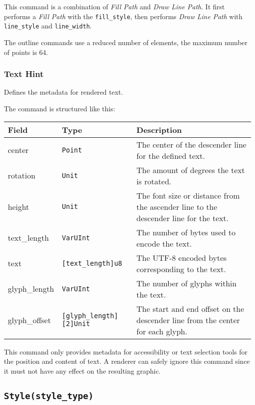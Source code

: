 \documentclass[]{article}
\begin{document}
This command is a combination of \emph{Fill Path} and \emph{Draw Line Path}.
It first performs a \emph{Fill Path} with the \texttt{fill\_style}, then
performs \emph{Draw Line Path} with \texttt{line\_style} and
\texttt{line\_width}.

The outline commands use a reduced number of elements, the maximum
number of points is 64.

\hypertarget{text-hint}{\subsubsection{Text Hint}\label{text-hint}}

Defines the metadata for rendered text.

The command is structured like this:

\begin{longtable}[]{@{}p{1in}p{1.6in}p{3.4in}@{}}
\toprule
Field & Type & Description \\
\midrule
\endhead
center        & \texttt{Point}                          & The center of the descender line for the defined text. \\
rotation      & \texttt{Unit}                           & The amount of degrees the text is rotated. \\
height        & \texttt{Unit}                           & The font size or distance from the ascender line to the descender line for the text. \\
text\_length  & \texttt{VarUInt}                        & The number of bytes used to encode the text. \\
text          & \texttt{{[}text\_length{]}u8}           & The UTF-8 encoded bytes corresponding to the text. \\
glyph\_length & \texttt{VarUInt}                        & The number of glyphs within the text. \\
glyph\_offset & \texttt{{[}glyph\_length{]}{[}2{]}Unit} & The start and end offset on the descender line from the center for each glyph. \\
\bottomrule
\end{longtable}

This command only provides metadata for accessibility or text selection tools
for the position and content of text. A renderer can safely ignore this command
since it must not have any effect on the resulting graphic.

\hypertarget{stylestyle_type}{\subsection{\texorpdfstring{\texttt{Style(style\_type)}}{Style(style\_type)}}\label{stylestyle_type}}
\end{document}
